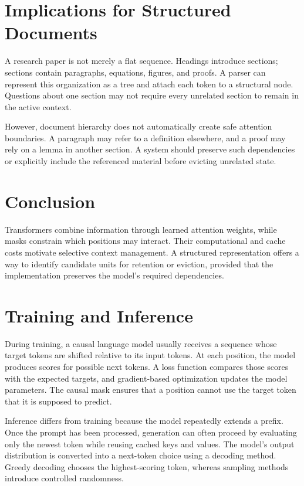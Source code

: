 \documentclass{article}
\begin{document}
\section{Implications for Structured Documents}
A research paper is not merely a flat sequence. Headings introduce sections; sections contain paragraphs, equations, figures, and proofs. A parser can represent this organization as a tree and attach each token to a structural node. Questions about one section may not require every unrelated section to remain in the active context.

However, document hierarchy does not automatically create safe attention boundaries. A paragraph may refer to a definition elsewhere, and a proof may rely on a lemma in another section. A system should preserve such dependencies or explicitly include the referenced material before evicting unrelated state.

\section{Conclusion}
Transformers combine information through learned attention weights, while masks constrain which positions may interact. Their computational and cache costs motivate selective context management. A structured representation offers a way to identify candidate units for retention or eviction, provided that the implementation preserves the model's required dependencies.


\section{Training and Inference}
During training, a causal language model usually receives a sequence whose target tokens are shifted relative to its input tokens. At each position, the model produces scores for possible next tokens. A loss function compares those scores with the expected targets, and gradient-based optimization updates the model parameters. The causal mask ensures that a position cannot use the target token that it is supposed to predict.

Inference differs from training because the model repeatedly extends a prefix. Once the prompt has been processed, generation can often proceed by evaluating only the newest token while reusing cached keys and values. The model's output distribution is converted into a next-token choice using a decoding method. Greedy decoding chooses the highest-scoring token, whereas sampling methods introduce controlled randomness.
\end{document}
